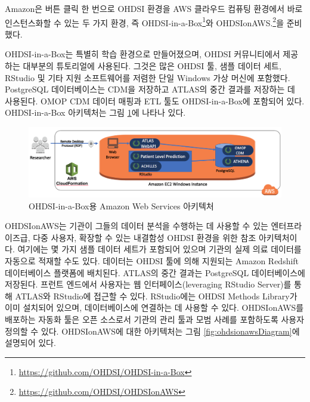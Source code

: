 \documentclass[10.5pt]{book}
\let\rmarkdownfootnote\footnote%
\def\footnote{\protect\rmarkdownfootnote}
\theoremstyle{definition}
\theoremstyle{definition}
\theoremstyle{definition}
\theoremstyle{remark}
\begin{document}
Amazon은 버튼 클릭 한 번으로 OHDSI 환경을 AWS 클라우드 컴퓨팅 환경에서
바로 인스턴스화할 수 있는 두 가지 환경, 즉 OHDSI-in-a-Box\footnote{\url{https://github.com/OHDSI/OHDSI-in-a-Box}}와
OHDSIonAWS.\footnote{\url{https://github.com/OHDSI/OHDSIonAWS}}을
준비했다. 

OHDSI-in-a-Box는 특별히 학습 환경으로 만들어졌으며, OHDSI 커뮤니티에서
제공하는 대부분의 튜토리얼에 사용된다. 그것은 많은 OHDSI 툴, 샘플 데이터
세트, RStudio 및 기타 지원 소프트웨어를 저렴한 단일 Windows 가상 머신에
포함했다. PostgreSQL 데이터베이스는 CDM을 저장하고 ATLAS의 중간 결과를
저장하는 데 사용된다. OMOP CDM 데이터 매핑과 ETL 툴도 OHDSI-in-a-Box에
포함되어 있다. OHDSI-in-a-Box 아키텍처는 그림
\ref{fig:ohdsiinaboxDiagram}에 나타나 있다.

\begin{figure}

{\centering \includegraphics[width=1\linewidth]{images/OhdsiAnalyticsTools/OHDSI-in-a-BoxDiagram} 

}

\caption{OHDSI-in-a-Box용 Amazon Web Services 아키텍처}\label{fig:ohdsiinaboxDiagram}
\end{figure}

OHDSIonAWS는 기관이 그들의 데이터 분석을 수행하는 데 사용할 수 있는
엔터프라이즈급, 다중 사용자, 확장할 수 있는 내결함성 OHDSI 환경을 위한
참조 아키텍처이다. 여기에는 몇 가지 샘플 데이터 세트가 포함되어 있으며
기관의 실제 의료 데이터를 자동으로 적재할 수도 있다. 데이터는 OHDSI 툴에
의해 지원되는 Amazon Redshift 데이터베이스 플랫폼에 배치된다. ATLAS의
중간 결과는 PostgreSQL 데이터베이스에 저장된다. 프런트 엔드에서 사용자는
웹 인터페이스(leveraging RStudio Server)를 통해 ATLAS와 RStudio에 접근할
수 있다. RStudio에는 OHDSI Methods Library가 이미 설치되어 있으며,
데이터베이스에 연결하는 데 사용할 수 있다. OHDSIonAWS를 배포하는 자동화
툴은 오픈 소스로서 기관의 관리 툴과 모범 사례를 포함하도록 사용자 정의할
수 있다. OHDSIonAWS에 대한 아키텍처는 그림 \ref{fig:ohdsionawsDiagram}에
설명되어 있다.
\end{document}
